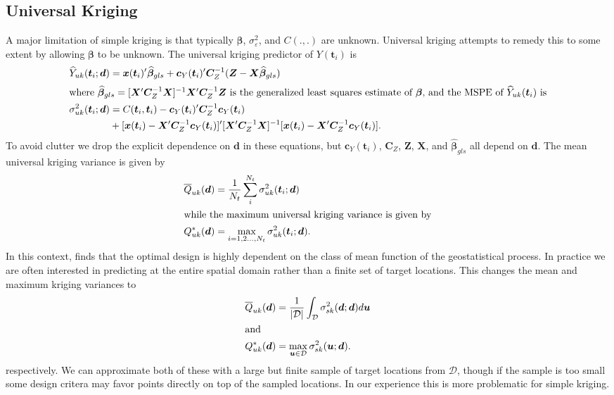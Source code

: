 \documentclass[12pt]{article}
\begin{document}
\subsection{Universal Kriging}
A major limitation of simple kriging is that typically $\bm{\beta}$, $\sigma^2_{\varepsilon}$, and $C(.,.)$ are unknown. Universal kriging attempts to remedy this to some extent by allowing $\bm{\beta}$ to be unknown. The universal kriging predictor of $Y(\bm{t}_i)$ is \citep[Section~4.1.2]{cressie2015statistics}
\begin{align*}
\widehat{Y}_{uk}(\bm{t}_i;\bm{d}) &= \bm{x}(\bm{t}_i)'\widehat{\bm{\beta}}_{gls} + \bm{c}_Y(\bm{t}_i)'\bm{C}_Z^{-1}(\bm{Z} - \bm{X}\widehat{\bm{\beta}}_{gls})\\
\intertext{where $\widehat{\bm{\beta}}_{gls} = [\bm{X}'\bm{C}_Z^{-1}\bm{X}]^{-1}\bm{X}'\bm{C}_Z^{-1}\bm{Z}$ is the generalized least squares estimate of $\bm{\beta}$, and the MSPE of $\widehat{Y}_{uk}(\bm{t}_i)$ is}
\sigma_{uk}^2(\bm{t}_i;\bm{d}) &= C(\bm{t}_i, \bm{t}_i) - \bm{c}_Y(\bm{t}_i)'\bm{C}_Z^{-1}\bm{c}_Y(\bm{t}_i)  \\
& + [\bm{x}(\bm{t}_i)  - \bm{X}'\bm{C}_Z^{-1}\bm{c}_Y(\bm{t}_i)]'[\bm{X}'\bm{C}_Z^{-1}\bm{X}]^{-1}[\bm{x}(\bm{t}_i)  - \bm{X}'\bm{C}_Z^{-1}\bm{c}_Y(\bm{t}_i)].
\end{align*}
To avoid clutter we drop the explicit dependence on $\bm{d}$ in these equations, but $\bm{c}_Y(\bm{t}_i)$, $\bm{C}_Z$, $\bm{Z}$, $\bm{X}$, and $\widehat{\bm{\beta}}_{gls}$ all depend on $\bm{d}$. The mean universal kriging variance is given by
\begin{align*}
\overline{Q}_{uk}(\bm{d}) &= \frac{1}{N_t}\sum_{i}^{N_t}\sigma^2_{uk}(\bm{t}_i;\bm{d})\\
\intertext{while the maximum universal kriging variance is given by}
Q_{uk}^*(\bm{d}) &= \max_{i=1,2\dots,N_t}\sigma^2_{uk}(\bm{t}_i;\bm{d}).
\end{align*}
In this context, \cite{zimmerman2006optimal} finds that the optimal design is highly dependent on the class of mean function of the geostatistical process. In practice we are often interested in predicting at the entire spatial domain rather than a finite set of target locations. This changes the mean and maximum kriging variances to
\begin{align*}
\overline{Q}_{uk}(\bm{d}) &= \frac{1}{|\mathcal{D}|}\int_{\mathcal{D}}\sigma^2_{sk}(\bm{d};\bm{d})d\bm{u}\\
\intertext{and}
Q_{uk}^*(\bm{d}) &= \max_{\bm{u}\in\mathcal{D}}\sigma^2_{sk}(\bm{u};\bm{d}).
\end{align*}
respectively. We can approximate both of these with a large but finite sample of target locations from $\mathcal{D}$, though if the sample is too small some design critera may favor points directly on top of the sampled locations. In our experience this is more problematic for simple kriging.
\end{document}
